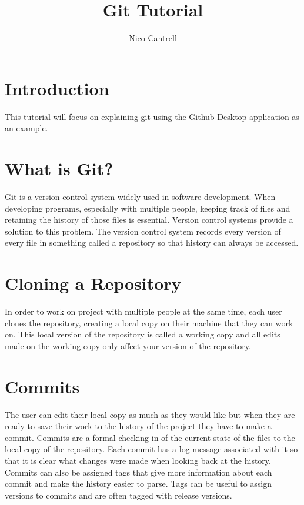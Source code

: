 \documentclass{article}
\title{Git Tutorial}
\author{Nico Cantrell}
\begin{document}
\maketitle

\section{Introduction}

This tutorial will focus on explaining git using the Github Desktop application as an example.

\section{What is Git?}

    Git is a version control system widely used in software development. When developing programs, especially with multiple people, keeping track of files and retaining the history of those files is essential. Version control systems provide a solution to this problem. The version control system records every version of every file in something called a repository so that history can always be accessed.

\section{Cloning a Repository}

    In order to work on project with multiple people at the same time, each user clones the repository, creating a local copy on their machine that they can work on. This local version of the repository is called a working copy and all edits made on the working copy only affect your version of the repository.    

\section{Commits}

    The user can edit their local copy as much as they would like but when they are ready to save their work to the history of the project they have to make a commit. Commits are a formal checking in of the current state of the files to the local copy of the repository. Each commit has a log message associated with it so that it is clear what changes were made when looking back at the history. Commits can also be assigned tags that give more information about each commit and make the history easier to parse. Tags can be useful to assign versions to commits and are often tagged with release versions.
\end{document}

